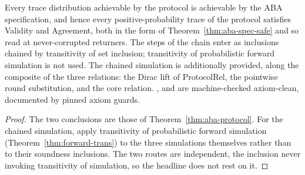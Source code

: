 \begin{theorem}
  \label{thm:aba-main}
  \leanok
  Every trace distribution achievable by the protocol is achievable by the ABA specification, and hence every positive-probability trace of the protocol satisfies Validity and Agreement, both in the form of Theorem~\ref{thm:aba-spec-safe} and so read at never-corrupted returners.
  The steps of the chain enter as inclusions chained by transitivity of set inclusion; transitivity of probabilistic forward simulation is not used.
  The chained simulation is additionally provided, along the composite of the three relations: the Dirac lift of $\mathrm{ProtocolRel}$, the pointwise round substitution, and the core relation.
  ,  and  are machine-checked axiom-clean, documented by pinned axiom guards.
\end{theorem}

\begin{proof}\leanok
  The two conclusions are those of Theorem~\ref{thm:aba-protocol}.
  For the chained simulation, apply transitivity of probabilistic forward simulation (Theorem~\ref{thm:forward-trans}) to the three simulations themselves rather than to their soundness inclusions.
  The two routes are independent, the inclusion never invoking transitivity of simulation, so the headline does not rest on it.
\end{proof}
